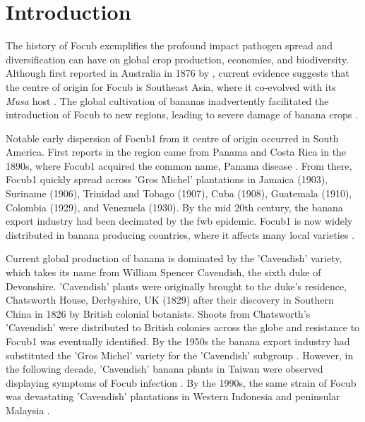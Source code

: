 
\section{Introduction}

The history of \acf{Focub} exemplifies the profound impact  pathogen spread and diversification can have on global crop production, economies, and biodiversity. Although first reported in Australia in 1876 by \textcite{Bancroft1876}, current evidence suggests that the centre of origin for \ac{Focub} is Southeast Asia, where it co-evolved with its \textit{Musa} host \parencite{Maryani2019}. The global cultivation of bananas inadvertently facilitated the introduction of \ac{Focub} to new regions, leading to severe damage of banana crops \parencite{Kema2021}.

Notable early dispersion of \ac{Focub1} from it centre of origin occurred in South America. First reports in the region came from Panama and Costa Rica in the 1890s, where \ac{Focub1} acquired the common name, Panama disease \parencite{Ashby1913}. From there, \ac{Focub1} quickly spread across 'Gros Michel' plantations in Jamaica (1903), Suriname (1906), Trinidad and Tobago (1907), Cuba (1908), Guatemala (1910), Colombia (1929), and Venezuela (1930). By the mid 20th century, the banana export industry had been decimated by the \ac{fwb} epidemic. \Ac{Focub1} is now widely distributed in banana producing countries, where it affects many local varieties \parencite{Dita2018}.

Current global production of banana is dominated by the 'Cavendish' variety, which takes its name from William Spencer Cavendish, the sixth duke of Devonshire. 'Cavendish' plants were originally brought to the duke's residence, Chatsworth House, Derbyshire, UK (1829) after their discovery in Southern China in 1826 by British colonial botanists. Shoots from Chatsworth's 'Cavendish' were distributed to British colonies across the globe and resistance to \ac{Focub1} was eventually identified. By the 1950s the banana export industry had substituted the 'Gros Michel' variety for the 'Cavendish' subgroup \parencite{Ploetz2005, Dita2018}. However, in the following decade, 'Cavendish' banana plants in Taiwan were observed displaying symptoms of \ac{Focub} infection \parencite{Agrios2005}. By the 1990s, the same strain of \ac{Focub} was devastating 'Cavendish' plantations in Western Indonesia and peninsular Malaysia \parencite{Kema2021}. 

